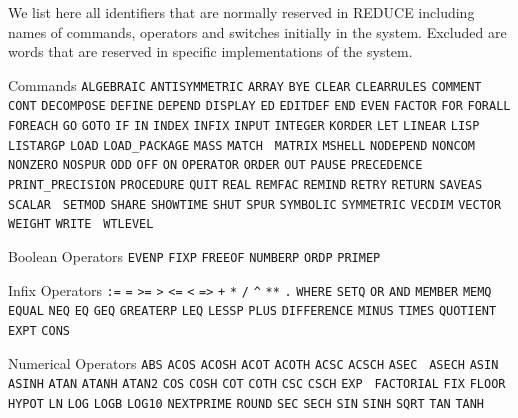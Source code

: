 We list here all identifiers that are normally reserved in REDUCE
including names of commands, operators and switches initially in the system.
Excluded are words that are reserved in specific implementations of the
system.

\vspace{13pt}
\begin{list}{}{\renewcommand{\makelabel}[1]{#1\hspace{\fill}}%
               \settowidth{\labelwidth}{Numerical Operators}%
               \setlength{\labelsep}{1em}%
               \sloppy}

\item[Commands] {\tt ALGEBRAIC} {\tt ANTISYMMETRIC}
{\tt ARRAY} {\tt BYE} {\tt CLEAR} \linebreak
{\tt CLEARRULES} {\tt COMMENT} {\tt
CONT} {\tt DECOMPOSE} {\tt DEFINE} {\tt DEPEND} {\tt DISPLAY} {\tt ED}
{\tt EDITDEF} {\tt END} {\tt EVEN} {\tt FACTOR} {\tt FOR} {\tt FORALL}
{\tt FOREACH} {\tt GO} {\tt GOTO} {\tt IF} {\tt IN} {\tt INDEX} {\tt INFIX}
{\tt INPUT} {\tt INTEGER} {\tt KORDER} {\tt LET} {\tt LINEAR} {\tt LISP}
{\tt LISTARGP} {\tt LOAD} {\tt LOAD\_PACKAGE} {\tt MASS} {\tt MATCH} {\tt
MATRIX} {\tt MSHELL} {\tt NODEPEND} {\tt NONCOM} {\tt NONZERO} {\tt NOSPUR}
{\tt ODD} {\tt OFF}
{\tt ON} {\tt OPERATOR} {\tt ORDER} {\tt OUT} {\tt PAUSE} {\tt PRECEDENCE}
{\tt PRINT\_PRECISION} {\tt PROCEDURE} {\tt QUIT} {\tt REAL} {\tt REMFAC}
{\tt REMIND} {\tt RETRY} {\tt RETURN} {\tt SAVEAS} {\tt SCALAR} {\tt
SETMOD} {\tt SHARE} {\tt SHOWTIME} {\tt SHUT} {\tt SPUR} {\tt SYMBOLIC}
{\tt SYMMETRIC} {\tt VECDIM} {\tt VECTOR} {\tt WEIGHT} {\tt WRITE} {\tt
WTLEVEL}

\item[Boolean Operators] {\tt EVENP} {\tt FIXP}
{\tt FREEOF} {\tt NUMBERP} {\tt ORDP} {\tt PRIMEP}

\item[Infix Operators]
 \verb|:=| \verb|=| \verb|>=| \verb|>| \verb|<=| \verb|<| \verb|=>|
 \verb|+| \verb|*| \verb|/| \verb|^| \verb|**| \verb|.| {\tt WHERE}
{\tt SETQ} {\tt OR} {\tt AND} {\tt MEMBER} {\tt MEMQ} {\tt
EQUAL} {\tt NEQ} {\tt EQ} {\tt GEQ} {\tt GREATERP} {\tt LEQ} {\tt LESSP}
{\tt PLUS} {\tt DIFFERENCE} {\tt MINUS} {\tt TIMES} {\tt QUOTIENT} {\tt
EXPT} {\tt CONS}

\item[Numerical Operators] {\tt ABS} {\tt ACOS}
{\tt ACOSH} {\tt ACOT} {\tt ACOTH} {\tt ACSC} {\tt ACSCH} {\tt ASEC} {\tt
ASECH} {\tt ASIN} {\tt ASINH} {\tt ATAN} {\tt ATANH} {\tt ATAN2} {\tt COS}
{\tt COSH} {\tt COT} {\tt COTH} {\tt CSC} {\tt CSCH} {\tt EXP} {\tt
FACTORIAL} {\tt FIX} {\tt FLOOR} {\tt HYPOT} {\tt LN} {\tt LOG} {\tt LOGB}
{\tt LOG10} {\tt NEXTPRIME} {\tt ROUND} {\tt SEC} {\tt SECH} {\tt SIN}
{\tt SINH} {\tt SQRT} {\tt TAN} {\tt TANH}


\end{list}
